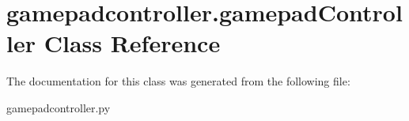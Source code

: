 \hypertarget{classgamepadcontroller_1_1gamepadController}{\section{gamepadcontroller.\-gamepad\-Controller Class Reference}
\label{classgamepadcontroller_1_1gamepadController}
}


The documentation for this class was generated from the following file\-:\begin{DoxyCompactItemize}
\item 
gamepadcontroller.\-py\end{DoxyCompactItemize}

